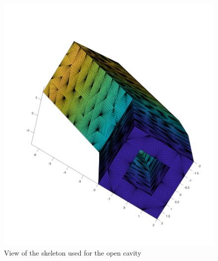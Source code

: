 \documentclass[11pt, oneside]{article}   	%
\begin{document}
\begin{figure}[H]
\begin{center}
\includegraphics[width=6in]{open_cavity_skeleton.pdf}
\end{center}
\caption{View of the skeleton used for the open cavity}
\label{open_cavity_skeleton}
\end{figure}
\end{document}
